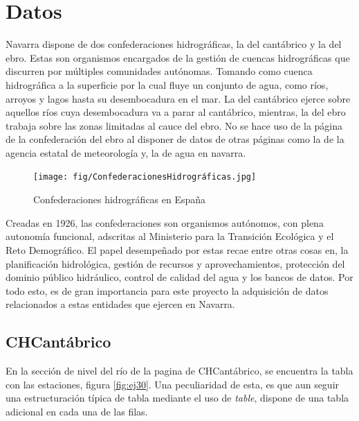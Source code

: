 \chapter[Datos]{Datos}
\label{Chap2}

Navarra dispone de dos confederaciones hidrográficas, la del cantábrico y la del ebro. Estas son organismos encargados de la gestión de cuencas hidrográficas que discurren por múltiples comunidades autónomas. Tomando como cuenca hidrográfica a la superficie por la cual fluye un conjunto de agua, como ríos, arroyos y lagos hasta su desembocadura en el mar.\newline
\newline
La del cantábrico ejerce sobre aquellos ríos cuya desembocadura va a parar al cantábrico, mientras, la del ebro trabaja sobre las zonas limitadas al cauce del ebro.\newline
\newline
No se hace uso de la página de la confederación del ebro al disponer de datos de otras páginas como la de la agencia estatal de meteorología y, la de agua en navarra. 

\begin{figure} [H]
	\centering
	\texttt{[image: fig/ConfederacionesHidrográficas.jpg]}
	\caption[Confederaciones hidrográficas en España]{Confederaciones hidrográficas en España}
	\label{fig:ej32}
\end{figure}

Creadas en 1926, las confederaciones son organismos autónomos, con plena autonomía funcional, adscritas al Ministerio para la Transición Ecológica y el Reto Demográfico. El papel desempeñado por estas recae entre otras cosas en, la planificación hidrológica, gestión de recursos y aprovechamientos, protección del dominio público hidráulico, control de calidad del agua y los bancos de datos.\newline
\newline
Por todo esto, es de gran importancia para este proyecto la adquisición de datos relacionados a estas entidades que ejercen en Navarra.

\section{CHCantábrico}
En la sección de nivel del río de la pagina de CHCantábrico, se encuentra la tabla con las estaciones, figura \ref{fig:ej30}. Una peculiaridad de esta, es que aun seguir una estructuración típica de tabla mediante el uso de \textit{table}, dispone de una tabla adicional en cada una de las filas.

